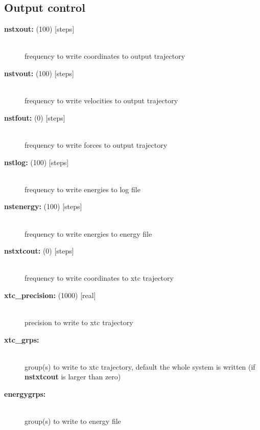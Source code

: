 \subsection{ Output control}
\begin{description}
\item[{\bf nstxout: }(100) {[steps]}]\mbox{}\\
frequency to write coordinates to output trajectory
\item[{\bf nstvout: }(100) {[steps]}]\mbox{}\\
frequency  to write velocities to output trajectory
\item[{\bf nstfout: }(0) {[steps]}]\mbox{}\\
frequency to write forces to output trajectory
\item[{\bf nstlog: }(100) {[steps]}]\mbox{}\\
frequency to write energies to log file
\item[{\bf nstenergy: }(100) {[steps]}]\mbox{}\\
frequency to write energies to energy file
\item[{\bf nstxtcout: }(0) {[steps]}]\mbox{}\\
frequency to write coordinates to xtc trajectory
\item[{\bf xtc\_precision: }(1000) {[real]}]\mbox{}\\
precision to write to xtc trajectory
\item[{\bf xtc\_grps:}]\mbox{}\\
group(s) to write to xtc trajectory, default the whole system is written
(if {\bf nstxtcout} is larger than zero)  
\item[{\bf energygrps:}]\mbox{}\\
group(s) to write to energy file
\end{description}

